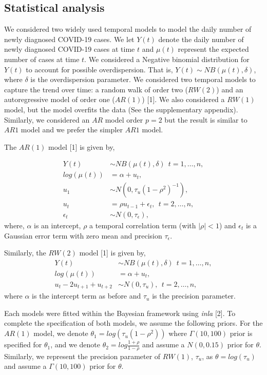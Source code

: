 \documentclass[10pt,letterpaper]{article}
\begin{document}
\hypertarget{statistical-analysis}{%
\subsection{Statistical analysis}\label{statistical-analysis}}

We considered two widely used temporal models to model the daily number
of newly diagnosed COVID-19 cases. We let \(Y(t)\) denote the daily
number of newly diagnosed COVID-19 cases at time \(t\) and \(\mu(t)\)
represent the expected number of cases at time \(t\). We considered a
Negative binomial distribution for \(Y(t)\) to account for possible
overdispersion. That is, \(Y(t) \sim NB(\mu(t), \delta)\), where
\(\delta\) is the overdispersion parameter. We considered two temporal
models to capture the trend over time: a random walk of order two
(\(RW(2)\)) and an autoregressive model of order one (\(AR(1)\))
{[}1{]}. We also considered a \(RW(1)\) model, but the model overfits the
data (See the supplementary appendix). Similarly, we considered an \(AR\)
model order \(p=2\) but the result is similar to \(AR1\) model and we
prefer the simpler \(AR1\) model.

The \(AR(1)\) model {[}1{]} is given by,

\[
\begin{aligned}
 Y(t) &\sim NB(\mu(t), \delta) \ \ t=1, \dots, n,\\
 log(\mu(t)) &= \alpha+u_t, \\
 u_1 &\sim N(0, \tau_u(1-\rho^2)^{-1}),  \\
  u_t &=\rho u_{t-1} +\epsilon_t, \ \ t=2, \dots, n,  \\
  \epsilon_t & \sim N(0, \tau_{\epsilon}),
\end{aligned}
\] where, \(\alpha\) is an intercept, \(\rho\) a temporal correlation
term (with \(|\rho|<1\)) and \(\epsilon_t\) is a Gaussian error term
with zero mean and precision \(\tau_{\epsilon}\).

Similarly, the \(RW(2)\) model {[}1{]} is given by, \[
\begin{aligned}
 Y(t) &\sim NB(\mu(t), \delta) \ \ t=1, \dots, n,\\
 log(\mu(t)) &= \alpha+u_t, \\
 u_t-2u_{t+1}+u_{t+2} &\sim N(0, \tau_u), \ \ t=2, \dots, n,
\end{aligned}
\] where \(\alpha\) is the intercept term as before and \(\tau_u\) is
the precision parameter.

Each models were fitted within the Bayesian framework using
\emph{inla} {[}2{]}. To complete the specification of both models, we
assume the following priors. For the \(AR(1)\) model, we denote
\(\theta_1=log(\tau_u(1-\rho^2))\) where \(\Gamma(10,100)\) prior is
specified for \(\theta_1\), and we denote
\(\theta_2=log\frac{1+\rho}{1-\rho}\) and assume a \(N(0, 0.15)\) prior
for \(\theta\). Similarly, we represent the precision parameter of
\(RW(1)\), \(\tau_u\), as \(\theta=log(\tau_u)\) and assume a
\(\Gamma (10,100)\) prior for \(\theta\).
\end{document}
